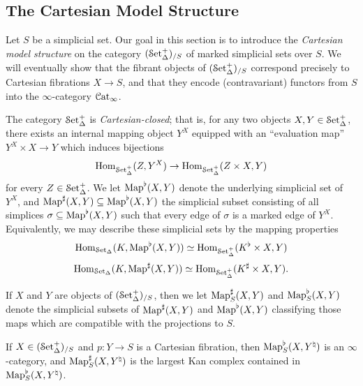 \subsection{The Cartesian Model Structure}\label{markmodel}

Let $S$ be a simplicial set. Our goal in this section is to introduce
the {\it Cartesian model structure} on the category $(\operatorname{\mathcal{S}et_{\Delta}^{+}})_{/S}$ of marked simplicial sets over $S$. We will eventually show that the fibrant objects of
$(\operatorname{\mathcal{S}et_{\Delta}^{+}})_{/S}$ correspond precisely to Cartesian fibrations $X \rightarrow S$, and that they encode (contravariant) functors from $S$ into the $\infty$-category
$\operatorname{\mathcal{C}at}_{\infty}$.

The category $\operatorname{\mathcal{S}et_{\Delta}^{+}}$ is {\it Cartesian-closed}; that is, for any two objects
$X,Y \in \operatorname{\mathcal{S}et_{\Delta}^{+}}$, there exists an internal mapping object $Y^X$ equipped with an
``evaluation map'' $Y^X \times X \rightarrow Y$ which induces bijections
$$\operatorname{Hom}_{\operatorname{\mathcal{S}et_{\Delta}^{+}}}(Z,Y^X) \rightarrow \operatorname{Hom}_{\operatorname{\mathcal{S}et_{\Delta}^{+}}}(Z \times X, Y)$$
for every $Z \in \operatorname{\mathcal{S}et_{\Delta}^{+}}$. We let $\operatorname{{Map}}^{\flat}(X,Y)$ denote the underlying simplicial
set of $Y^X$, and $\operatorname{{Map}}^{\sharp}(X,Y) \subseteq \operatorname{{Map}}^{\flat}(X,Y)$ the simplicial subset
consisting of all simplices $\sigma \subseteq \operatorname{{Map}}^{\flat}(X,Y)$ such that every edge of
$\sigma$ is a marked edge of $Y^X$. Equivalently, we may describe these simplicial sets by the mapping properties
$$ \operatorname{Hom}_{\operatorname{\mathcal{S}et_{\Delta}}}(K, \operatorname{{Map}}^{\flat}(X,Y)) \simeq \operatorname{Hom}_{\operatorname{\mathcal{S}et_{\Delta}^{+}}}( K^{\flat} \times X,Y) $$
$$ \operatorname{Hom}_{\operatorname{\mathcal{S}et_{\Delta}}}(K, \operatorname{{Map}}^{\sharp}(X,Y)) \simeq \operatorname{Hom}_{\operatorname{\mathcal{S}et_{\Delta}^{+}}}(K^{\sharp} \times X,Y).$$

If $X$ and $Y$ are objects of $(\operatorname{\mathcal{S}et_{\Delta}^{+}})_{/S}$, then we let
$\operatorname{{Map}}_{S}^{\sharp}(X,Y)$ and $\operatorname{{Map}}_{S}^{\flat}(X,Y)$ denote the simplicial subsets
of $\operatorname{{Map}}^{\sharp}(X,Y)$ and $\operatorname{{Map}}^{\flat}(X,Y)$ classifying those maps which are compatible with the projections to $S$.

\begin{remark}
If $X \in (\operatorname{\mathcal{S}et_{\Delta}^{+}})_{/S}$ and $p: Y \rightarrow S$ is a Cartesian fibration, then
$\operatorname{{Map}}^{\flat}_{S}(X,Y^{\natural})$ is an $\infty$-category, and $\operatorname{{Map}}^{\sharp}_{S}(X,Y^{\natural})$ is the largest Kan complex contained in $\operatorname{{Map}}^{\flat}_S(X,Y^{\natural})$.
\end{remark}

